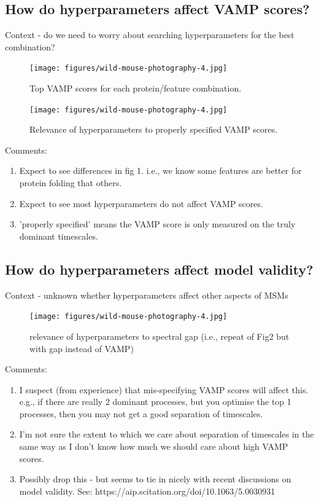 \documentclass{article}
\begin{document}
\subsection{How do hyperparameters affect VAMP scores? }

Context - do we need to worry about searching hyperparameters for the best combination? 

\begin{figure}
    \centering
    \texttt{[image: figures/wild-mouse-photography-4.jpg]}
    \caption{Top  VAMP scores for each protein/feature combination.}
    \label{fig:1}
\end{figure}


\begin{figure}
    \centering
    \texttt{[image: figures/wild-mouse-photography-4.jpg]}
    \caption{Relevance of hyperparameters to properly specified VAMP scores.}
    \label{fig:2}
\end{figure}


Comments: 
\begin{enumerate}
    \item Expect to see differences in fig 1. i.e., we know some features are better for protein folding that others. 
    \item Expect to see most hyperparameters do not affect VAMP scores. 
    \item 'properly specified' means the VAMP score is only measured on the truly dominant timescales. 
\end{enumerate}
 

\subsection{How do hyperparameters affect model validity?}

Context - unknown whether hyperparameters affect other aspects of MSMs

\begin{figure}
    \centering
    \texttt{[image: figures/wild-mouse-photography-4.jpg]}
    \caption{relevance of hyperparameters to spectral gap (i.e., repeat of Fig2 but with gap instead of VAMP) }
    \label{fig:4}
\end{figure}


Comments: 
\begin{enumerate}
    \item I suspect (from experience) that mis-specifying VAMP scores will affect this. e.g., if there are really 2 dominant processes, but you optimise the top 1 processes, then you may not get a good separation of timescales.  
    \item I'm not sure the extent to which we care about separation of timescales in the same way as I don't know how much we should care about high VAMP scores.  
    \item Possibly drop this - but seems to tie in nicely with recent discussions on model validity. See: https://aip.scitation.org/doi/10.1063/5.0030931
\end{enumerate}
\end{document}
